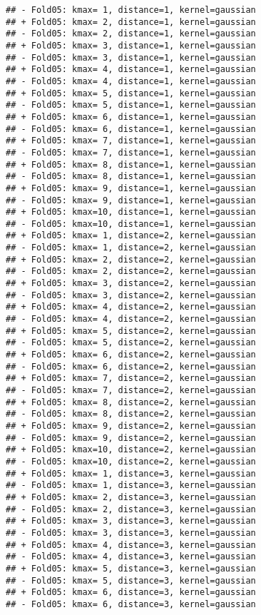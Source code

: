 \documentclass[
]{article}
\begin{document}
\begin{verbatim}
## - Fold05: kmax= 1, distance=1, kernel=gaussian 
## + Fold05: kmax= 2, distance=1, kernel=gaussian 
## - Fold05: kmax= 2, distance=1, kernel=gaussian 
## + Fold05: kmax= 3, distance=1, kernel=gaussian 
## - Fold05: kmax= 3, distance=1, kernel=gaussian 
## + Fold05: kmax= 4, distance=1, kernel=gaussian 
## - Fold05: kmax= 4, distance=1, kernel=gaussian 
## + Fold05: kmax= 5, distance=1, kernel=gaussian 
## - Fold05: kmax= 5, distance=1, kernel=gaussian 
## + Fold05: kmax= 6, distance=1, kernel=gaussian 
## - Fold05: kmax= 6, distance=1, kernel=gaussian 
## + Fold05: kmax= 7, distance=1, kernel=gaussian 
## - Fold05: kmax= 7, distance=1, kernel=gaussian 
## + Fold05: kmax= 8, distance=1, kernel=gaussian 
## - Fold05: kmax= 8, distance=1, kernel=gaussian 
## + Fold05: kmax= 9, distance=1, kernel=gaussian 
## - Fold05: kmax= 9, distance=1, kernel=gaussian 
## + Fold05: kmax=10, distance=1, kernel=gaussian 
## - Fold05: kmax=10, distance=1, kernel=gaussian 
## + Fold05: kmax= 1, distance=2, kernel=gaussian 
## - Fold05: kmax= 1, distance=2, kernel=gaussian 
## + Fold05: kmax= 2, distance=2, kernel=gaussian 
## - Fold05: kmax= 2, distance=2, kernel=gaussian 
## + Fold05: kmax= 3, distance=2, kernel=gaussian 
## - Fold05: kmax= 3, distance=2, kernel=gaussian 
## + Fold05: kmax= 4, distance=2, kernel=gaussian 
## - Fold05: kmax= 4, distance=2, kernel=gaussian 
## + Fold05: kmax= 5, distance=2, kernel=gaussian 
## - Fold05: kmax= 5, distance=2, kernel=gaussian 
## + Fold05: kmax= 6, distance=2, kernel=gaussian 
## - Fold05: kmax= 6, distance=2, kernel=gaussian 
## + Fold05: kmax= 7, distance=2, kernel=gaussian 
## - Fold05: kmax= 7, distance=2, kernel=gaussian 
## + Fold05: kmax= 8, distance=2, kernel=gaussian 
## - Fold05: kmax= 8, distance=2, kernel=gaussian 
## + Fold05: kmax= 9, distance=2, kernel=gaussian 
## - Fold05: kmax= 9, distance=2, kernel=gaussian 
## + Fold05: kmax=10, distance=2, kernel=gaussian 
## - Fold05: kmax=10, distance=2, kernel=gaussian 
## + Fold05: kmax= 1, distance=3, kernel=gaussian 
## - Fold05: kmax= 1, distance=3, kernel=gaussian 
## + Fold05: kmax= 2, distance=3, kernel=gaussian 
## - Fold05: kmax= 2, distance=3, kernel=gaussian 
## + Fold05: kmax= 3, distance=3, kernel=gaussian 
## - Fold05: kmax= 3, distance=3, kernel=gaussian 
## + Fold05: kmax= 4, distance=3, kernel=gaussian 
## - Fold05: kmax= 4, distance=3, kernel=gaussian 
## + Fold05: kmax= 5, distance=3, kernel=gaussian 
## - Fold05: kmax= 5, distance=3, kernel=gaussian 
## + Fold05: kmax= 6, distance=3, kernel=gaussian 
## - Fold05: kmax= 6, distance=3, kernel=gaussian 

\end{verbatim}
\end{document}

